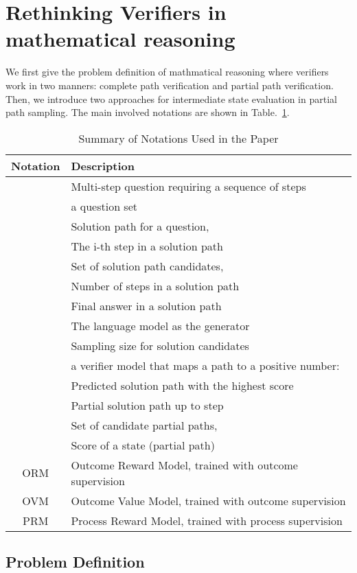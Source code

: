 \documentclass[11pt]{article}
\theoremstyle{plain}
\theoremstyle{claim}
\theoremstyle{rethinking}
\theoremstyle{researchquestion}
\theoremstyle{findings}
\theoremstyle{fact}
\theoremstyle{proper}
\theoremstyle{remark}
\begin{document}
\section{Rethinking Verifiers in mathematical reasoning}
\label{sec:background}

We first give the problem definition of mathmatical reasoning where verifiers work in two manners:  complete path verification and partial path verification. 
Then, we introduce two approaches for intermediate state evaluation in partial path sampling. The main involved notations are shown in Table.~\ref{tab:notations}.

\begin{table}[t]
\scriptsize
\centering
\begin{tabular}{cl}
\hline
\textbf{Notation} & \textbf{Description} \\ \hline
 & Multi-step question requiring a sequence of steps \\
 & a question set\\
 & Solution path for a question,  \\
 & The i-th step in a solution path \\
 & Set of solution path candidates,  \\
 & Number of steps in a solution path \\
 & Final answer in a solution path \\
 & The language model as the generator  \\
 & Sampling size for solution candidates \\
 & a verifier model  that  maps a path to a positive number:    \\
 & Predicted solution path with the highest score \\
 & Partial solution path up to step  \\
 & Set of candidate partial paths,  \\
 & Score of a state (partial path) \\
ORM & Outcome Reward Model, trained with outcome supervision \\
OVM & Outcome Value Model, trained with outcome supervision \\
PRM & Process Reward Model, trained with process supervision \\
\bottomrule
\end{tabular}
\caption{Summary of Notations Used in the Paper}
\label{tab:notations}
\end{table}


\subsection{Problem Definition}
\end{document}

